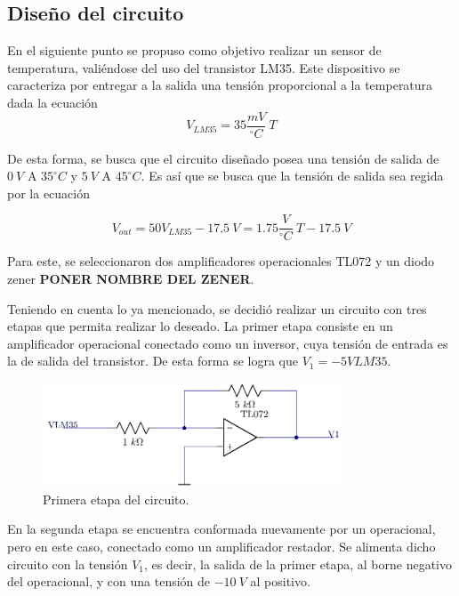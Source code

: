 \documentclass[a4paper]{article}
\begin{document}
\subsection{Diseño del circuito}

En el siguiente punto se propuso como objetivo realizar un sensor de temperatura, valiéndose del uso del transistor LM35. Este dispositivo se caracteriza por entregar a la salida una tensión proporcional a la temperatura dada la ecuación
\[
	V_{LM35} = 35 \frac{mV}{^{\circ}C} \ T
\]

De esta forma, se busca que el circuito diseñado posea una tensión de salida de $ 0 \ V $ A $ 35 ^{\circ}C $ y $ 5 \ V $ A $ 45 ^{\circ}C $. Es así que se busca que la tensión de salida sea regida por la ecuación

\begin{equation}
	V_{out} = 50V_{LM35} - 17.5 \ V =  1.75 \frac{V}{^{\circ}C} \ T - 17.5 \ V
	\label{equ:sistema}
\end{equation}

Para este, se seleccionaron dos amplificadores operacionales TL072 y un diodo zener \textbf{PONER NOMBRE DEL ZENER}.

Teniendo en cuenta lo ya mencionado, se decidió realizar un circuito con tres etapas que permita realizar lo deseado.
La primer etapa consiste en un amplificador operacional conectado como un inversor, cuya tensión de entrada es la de salida del transistor. De esta forma se logra que $V_1 = -5 V{LM35}$.

\begin{figure}[H]
	\centering
	\includegraphics[width=0.8\textwidth]{Ejercicio6/Imagenes/CircuitoEtapa1-M1.png}
\caption{Primera etapa del circuito.}
	\label{fig:cir1-M1}
\end{figure}

En la segunda etapa se encuentra conformada nuevamente por un operacional, pero en este caso, conectado como un amplificador restador. Se alimenta dicho circuito con la tensión $V_1$, es decir, la salida de la primer etapa, al borne negativo del operacional, y con una tensión de $- 10 \ V$ al positivo.
\end{document}
